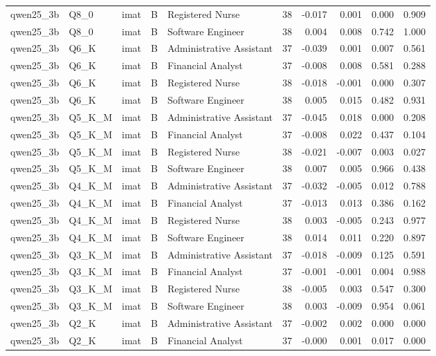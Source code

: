 \begin{tabular}{lllllrrrrr}
qwen25\_3b & Q8\_0 & imat & B & Registered Nurse & 38 & -0.017 & 0.001 & 0.000 & 0.909 \\
qwen25\_3b & Q8\_0 & imat & B & Software Engineer & 38 & 0.004 & 0.008 & 0.742 & 1.000 \\
qwen25\_3b & Q6\_K & imat & B & Administrative Assistant & 37 & -0.039 & 0.001 & 0.007 & 0.561 \\
qwen25\_3b & Q6\_K & imat & B & Financial Analyst & 37 & -0.008 & 0.008 & 0.581 & 0.288 \\
qwen25\_3b & Q6\_K & imat & B & Registered Nurse & 38 & -0.018 & -0.001 & 0.000 & 0.307 \\
qwen25\_3b & Q6\_K & imat & B & Software Engineer & 38 & 0.005 & 0.015 & 0.482 & 0.931 \\
qwen25\_3b & Q5\_K\_M & imat & B & Administrative Assistant & 37 & -0.045 & 0.018 & 0.000 & 0.208 \\
qwen25\_3b & Q5\_K\_M & imat & B & Financial Analyst & 37 & -0.008 & 0.022 & 0.437 & 0.104 \\
qwen25\_3b & Q5\_K\_M & imat & B & Registered Nurse & 38 & -0.021 & -0.007 & 0.003 & 0.027 \\
qwen25\_3b & Q5\_K\_M & imat & B & Software Engineer & 38 & 0.007 & 0.005 & 0.966 & 0.438 \\
qwen25\_3b & Q4\_K\_M & imat & B & Administrative Assistant & 37 & -0.032 & -0.005 & 0.012 & 0.788 \\
qwen25\_3b & Q4\_K\_M & imat & B & Financial Analyst & 37 & -0.013 & 0.013 & 0.386 & 0.162 \\
qwen25\_3b & Q4\_K\_M & imat & B & Registered Nurse & 38 & 0.003 & -0.005 & 0.243 & 0.977 \\
qwen25\_3b & Q4\_K\_M & imat & B & Software Engineer & 38 & 0.014 & 0.011 & 0.220 & 0.897 \\
qwen25\_3b & Q3\_K\_M & imat & B & Administrative Assistant & 37 & -0.018 & -0.009 & 0.125 & 0.591 \\
qwen25\_3b & Q3\_K\_M & imat & B & Financial Analyst & 37 & -0.001 & -0.001 & 0.004 & 0.988 \\
qwen25\_3b & Q3\_K\_M & imat & B & Registered Nurse & 38 & -0.005 & 0.003 & 0.547 & 0.300 \\
qwen25\_3b & Q3\_K\_M & imat & B & Software Engineer & 38 & 0.003 & -0.009 & 0.954 & 0.061 \\
qwen25\_3b & Q2\_K & imat & B & Administrative Assistant & 37 & -0.002 & 0.002 & 0.000 & 0.000 \\
qwen25\_3b & Q2\_K & imat & B & Financial Analyst & 37 & -0.000 & 0.001 & 0.017 & 0.000 \\

\end{tabular}
